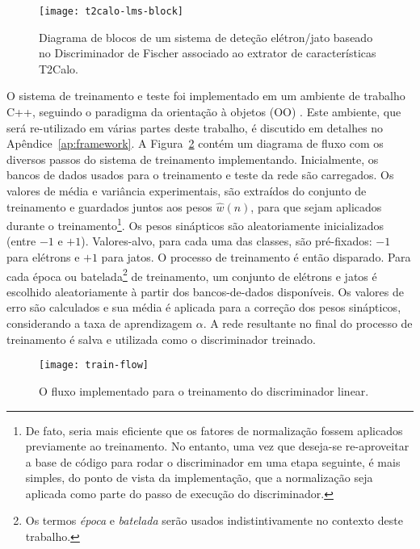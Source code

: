 \begin{figure}
\begin{center}
\texttt{[image: t2calo-lms-block]}
\end{center}
\caption{Diagrama de blocos de um sistema de deteção elétron/jato baseado no
Discriminador de Fischer associado ao extrator de características T2Calo.}
\label{fig:t2calo-lms-block}
\end{figure}

O sistema de treinamento e teste foi implementado em um ambiente de trabalho
C++, seguindo o paradigma da orientação à objetos (OO) \cite{stroustrup,
booch}. Este ambiente, que será re-utilizado em várias partes deste trabalho,
é discutido em detalhes no Apêndice~\ref{ap:framework}. A
Figura~\ref{fig:train-flow} contém um diagrama de fluxo com os diversos passos
do sistema de treinamento implementando. Inicialmente, os bancos de dados
usados para o treinamento e teste da rede são carregados. Os valores de média
e variância experimentais, são extraídos do conjunto de treinamento e
guardados juntos aos pesos $\hat{w}(n)$, para que sejam aplicados durante o
treinamento\footnote{De fato, seria mais eficiente que os fatores de
normalização fossem aplicados previamente ao treinamento. No entanto, uma vez
que deseja-se re-aproveitar a base de código para rodar o discriminador em uma
etapa seguinte, é mais simples, do ponto de vista da implementação, que a
normalização seja aplicada como parte do passo de execução do
discriminador.}. Os pesos sinápticos são aleatoriamente inicializados (entre
$-1$ e $+1$). Valores-alvo, para cada uma das classes, são pré-fixados: $-1$
para elétrons e $+1$ para jatos. O processo de treinamento é então
disparado. Para cada época ou batelada\footnote{Os termos \textit{época} e
\textit{batelada} serão usados indistintivamente no contexto deste trabalho.}
de treinamento, um conjunto de elétrons e jatos é escolhido aleatoriamente à
partir dos bancos-de-dados disponíveis. Os valores de erro são calculados e
sua média é aplicada para a correção dos pesos sinápticos, considerando a taxa
de aprendizagem $\alpha$. A rede resultante no final do processo de
treinamento é salva e utilizada como o discriminador treinado.

\begin{figure}
\begin{center}
\texttt{[image: train-flow]}
\end{center}
\caption{O fluxo implementado para o treinamento do discriminador linear.}
\label{fig:train-flow}
\end{figure}

